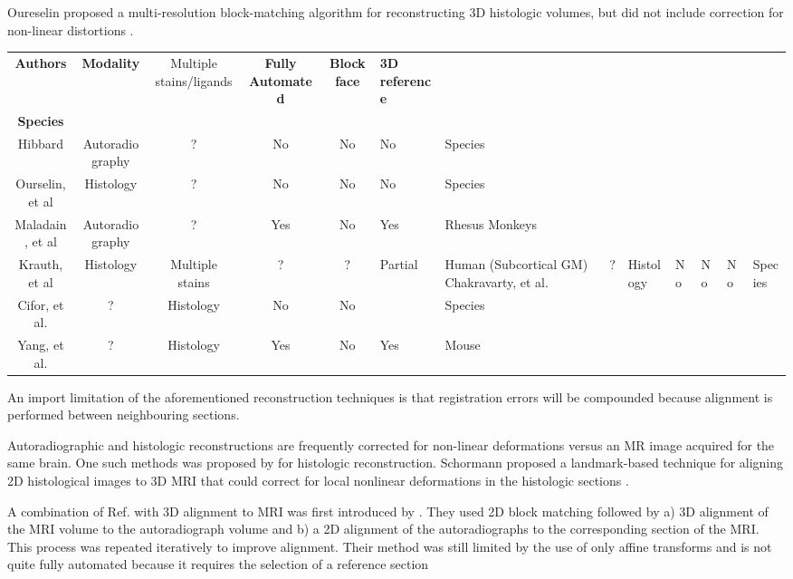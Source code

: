 \documentclass[12pt]{article}
\begin{document}
Oureselin proposed a multi-resolution block-matching algorithm for reconstructing 3D histologic volumes, but did not include correction for non-linear distortions \cite{Ourselin2001}.
\begin{center}
\begin{tabular}{ | c | c | c | c | c | }
   \hline
    \textbf{Authors} & \textbf{Modality} & Multiple stains/ligands & \textbf{Fully Automated} & \textbf{Blockface} & \textbf{3D reference} \\ \textbf{Species} \\ \hline
    Hibbard \cite{Hibbard1984} & Autoradiography & ? & No & No & No &  Species \\
    Ourselin, et al \cite{Ourselin2001} & Histology & ? & No & No & No &  Species \\
    Maladain, et al \cite{Maladain2004} & Autoradiography & ? & Yes & No & Yes &  Rhesus Monkeys \\
    Krauth, et al \cite{Krauth2010} & Histology & Multiple stains & ? & ? & Partial & Human (Subcortical GM)
    Chakravarty, et al. \cite{Chakravarty2006} & ? & Histology & No & No & No & Species\\ 
    Cifor, et al. \cite{Cifor2011} & ? & Histology & No & No &  & Species\\ 
    Yang, et al. \cite{Yang2012} & ? & Histology & Yes & No & Yes & Mouse \\ 
    \hline
    
\end{tabular}
\end{center}

An import limitation of the aforementioned reconstruction techniques is that registration errors will be compounded because alignment is performed between neighbouring sections. 

Autoradiographic and histologic reconstructions are frequently corrected for non-linear deformations versus an MR image acquired for the same brain. One such methods was proposed by \cite{Schormann1993} for histologic reconstruction. Schormann proposed a landmark-based technique for aligning 2D histological images to 3D MRI that could correct for local nonlinear deformations in the histologic sections \cite{Shormann1995}. 

A combination of Ref. \cite{Ourselin2001} with 3D alignment to MRI was first introduced by \cite{Malandain2004}. They used 2D block matching followed by a) 3D alignment of the MRI volume to the autoradiograph volume and b) a 2D alignment of the autoradiographs to the corresponding section of the MRI. This process was repeated iteratively to improve alignment. Their method was still limited by the use of only affine transforms and is not quite fully automated because it requires the selection of a reference section
\end{document}
